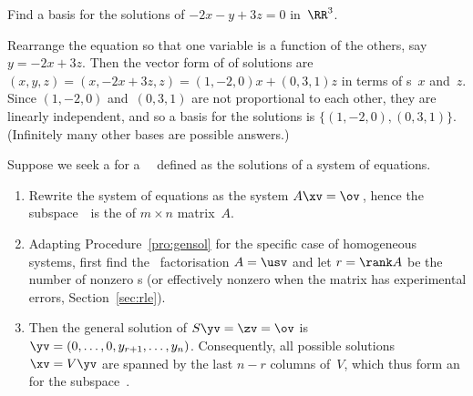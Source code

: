 \begin{example} \label{eg:}
Find a basis for the solutions of \(-2x-y+3z=0\) in~\(\RR^3\).
\begin{solution} 
Rearrange the equation so that one variable is a function of the others, say \(y=-2x+3z\).
Then the vector form of of solutions are \((x,y,z)=(x,-2x+3z,z)=(1,-2,0)x+(0,3,1)z\) in terms of s~\(x\) and~\(z\).
Since \((1,-2,0)\) and~\((0,3,1)\) are not proportional to each other, they are linearly independent, and so a basis for the solutions is \(\{(1,-2,0),(0,3,1)\}\).
(Infinitely many other bases are possible answers.)
\end{solution}
\end{example}





\begin{procedure} \label{pro:bfe}
Suppose we seek a  for a ~\WW\ defined as the solutions of a system of equations.
\begin{enumerate}
\item Rewrite the system of equations as the  system \(A\xv=\ov\)\,, hence the subspace~\WW\ is the  of \(m\times n\) matrix~\(A\).
\item  Adapting Procedure~\ref{pro:gensol} for the specific case of homogeneous systems, first find the \svd\ factorisation \(A=\usv\) and let \(r=\rank A\) be the number of nonzero s (or effectively nonzero when the matrix has experimental errors, Section~\ref{sec:rle}).
\item Then the general solution of \(S\yv=\zv=\ov\) is \(\yv=(0,\ldots,0,y_{r+1},\ldots,y_n)\).
Consequently, all possible solutions \(\xv=V\yv\) are spanned by the last \(n-r\) columns of~\(V\), which thus form an  for the subspace~\WW.
\end{enumerate}
\end{procedure}



